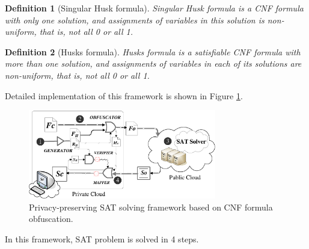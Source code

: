 \documentclass[conference]{IEEEtran}
\newtheorem{definition}{\textbf{Definition}}
\begin{document}
\begin{definition}[Singular Husk formula]\label{Singular-Husk-formula-definition}
Singular Husk formula is a CNF formula with only one solution,
and assignments of variables in this solution is non-uniform,
that is,
not all 0 or all 1.
\end{definition}

\begin{definition}[Husks formula]\label{Husks-formula-definition}
Husks formula is a satisfiable CNF formula with more than one solution,
and assignments of variables in each of its solutions are non-uniform,
that is,
not all 0 or all 1.
\end{definition}

Detailed implementation of this framework is shown in Figure \ref{fig_cldSAT}.
\begin{figure}
\footnotesize\centering
\centerline{\includegraphics[width=8.2cm]{Visio-cloudsat.eps}}
\caption{Privacy-preserving SAT solving framework based on CNF formula obfuscation.}
\label{fig_cldSAT}
\end{figure}
In this framework, SAT problem is solved in 4 steps.\\
\end{document}

